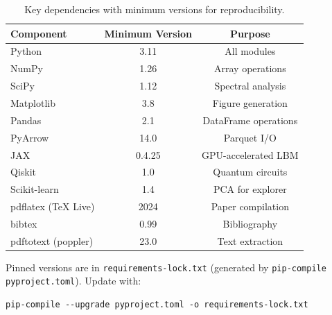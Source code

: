 \begin{table}[ht]
\centering
\begin{tabular}{lcc}
\toprule
\textbf{Component} & \textbf{Minimum Version} & \textbf{Purpose} \\
\midrule
Python & 3.11 & All modules \\
NumPy & 1.26 & Array operations \\
SciPy & 1.12 & Spectral analysis \\
Matplotlib & 3.8 & Figure generation \\
Pandas & 2.1 & DataFrame operations \\
PyArrow & 14.0 & Parquet I/O \\
JAX & 0.4.25 & GPU-accelerated LBM \\
Qiskit & 1.0 & Quantum circuits \\
Scikit-learn & 1.4 & PCA for explorer \\
pdflatex (TeX Live) & 2024 & Paper compilation \\
bibtex & 0.99 & Bibliography \\
pdftotext (poppler) & 23.0 & Text extraction \\
\bottomrule
\end{tabular}
\caption{Key dependencies with minimum versions for reproducibility.}
\label{tab:dependencies}
\end{table}

Pinned versions are in \texttt{requirements-lock.txt} (generated by
\texttt{pip-compile pyproject.toml}).  Update with:
\begin{verbatim}
pip-compile --upgrade pyproject.toml -o requirements-lock.txt
\end{verbatim}
